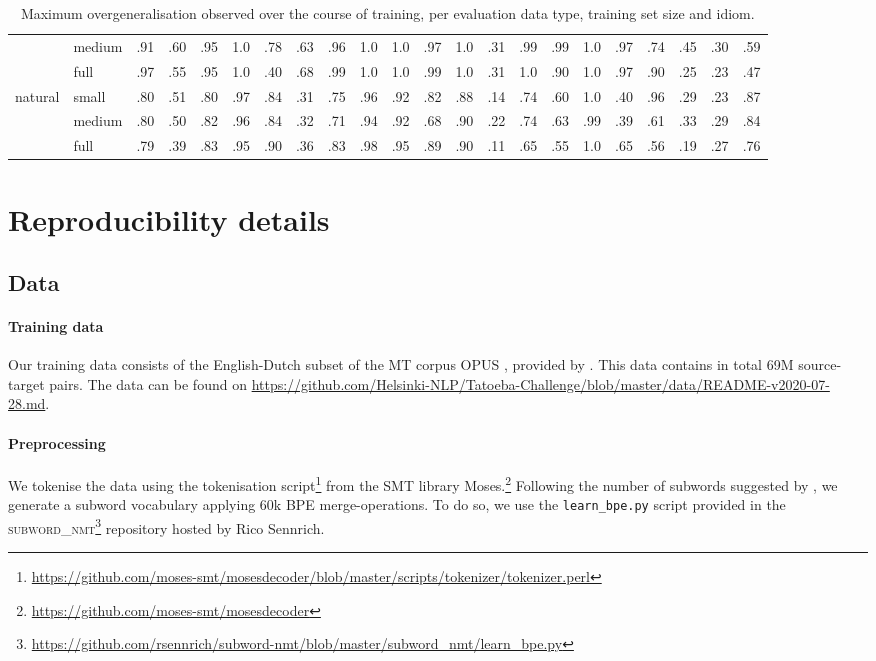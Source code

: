 \begin{table*}[!ht]
\begin{tabular}{llcccccccccccccccccccc}
     & medium           & .91 & .60 & .95 & 1.0 & .78 & .63 & .96 & 1.0 & 1.0 & .97 & 1.0 & .31 & .99 & .99 & 1.0 & .97 & .74 & .45 & .30 & .59 \\
     & full             & .97 & .55 & .95 & 1.0 & .40 & .68 & .99 & 1.0 & 1.0 & .99 & 1.0 & .31 & 1.0 & .90 & 1.0 & .97 & .90 & .25 & .23 & .47 \\
    natural & small     & .80 & .51 & .80 & .97 & .84 & .31 & .75 & .96 & .92 & .82 & .88 & .14 & .74 & .60 & 1.0 & .40 & .96 & .29 & .23 & .87 \\
     & medium           & .80 & .50 & .82 & .96 & .84 & .32 & .71 & .94 & .92 & .68 & .90 & .22 & .74 & .63 & .99 & .39 & .61 & .33 & .29 & .84 \\
     & full             & .79 & .39 & .83 & .95 & .90 & .36 & .83 & .98 & .95 & .89 & .90 & .11 & .65 & .55 & 1.0 & .65 & .56 & .19 & .27 & .76 \\
 \bottomrule
    \end{tabular}
    \caption{Maximum overgeneralisation observed over the course of training, per evaluation data type, training set size and idiom.}
    \label{tab:global_compositionality_appendix}
\end{table*}



\section{Reproducibility details}\label{app:reproducibility}

\subsection{Data}

\paragraph{Training data} Our training data consists of the English-Dutch subset of the MT corpus \textsc{OPUS} \citep{tiedemann2020opus}, provided by \citet{tiedemann-2020-tatoeba}.
This data contains in total 69M source-target pairs.
The data can be found on
\url{https://github.com/Helsinki-NLP/Tatoeba-Challenge/blob/master/data/README-v2020-07-28.md}.

\paragraph{Preprocessing}
We tokenise the data using the tokenisation script\footnote{\url{https://github.com/moses-smt/mosesdecoder/blob/master/scripts/tokenizer/tokenizer.perl}} from the SMT library Moses.\footnote{\url{https://github.com/moses-smt/mosesdecoder}}
Following the number of subwords suggested by \citet{tiedemann-2020-tatoeba}, we generate a subword vocabulary applying 60k BPE merge-operations.
To do so, we use the \texttt{learn\_bpe.py} script provided in the \textsc{subword\_nmt}\footnote{\url{https://github.com/rsennrich/subword-nmt/blob/master/subword_nmt/learn_bpe.py}} repository hosted by Rico Sennrich.

